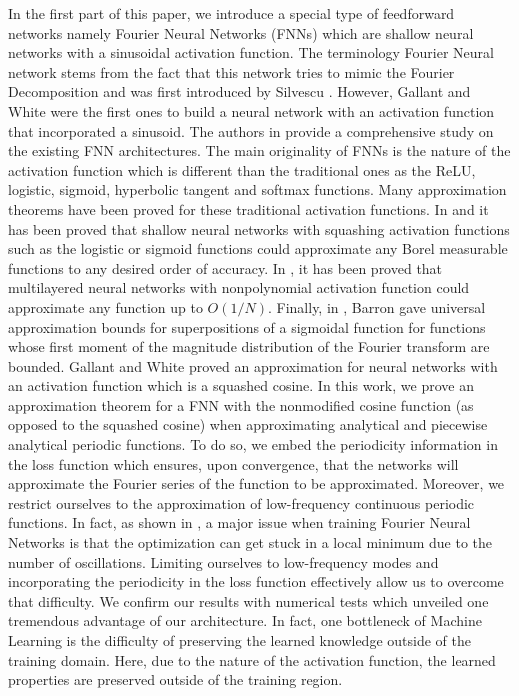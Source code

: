 \documentclass[AMS,STIX1COL]{WileyNJD-v2}
\begin{document}
In the first part of this paper, we introduce a special type of feedforward networks namely Fourier Neural Networks (FNNs) which are shallow neural networks with a sinusoidal activation function. The terminology Fourier Neural network stems from the fact that this network tries to mimic the Fourier Decomposition and was first introduced by Silvescu \cite{Silvescu}. However, Gallant and White \cite{Gallant} were the first ones to build a neural network with an activation function that incorporated a sinusoid. The authors in \cite{Zhumekonov2019} provide a comprehensive study on the existing FNN architectures. The main originality of FNNs is the nature of the activation function which is different than the traditional ones as the ReLU, logistic, sigmoid, hyperbolic tangent and softmax functions. Many approximation theorems have been proved for these traditional activation functions. In \cite{Cybenko1992} and \cite{HORNIK1989} it has been proved that shallow neural networks with squashing activation functions such as the logistic or sigmoid functions could approximate any Borel measurable functions to any desired order of accuracy. In \cite{Leshno}, it has been proved that multilayered neural networks with nonpolynomial activation function could approximate any function up to $O(1/N)$. Finally,  in \cite{Barron}, Barron gave universal approximation bounds for superpositions of a sigmoidal function for functions whose first moment of the magnitude distribution of the Fourier transform are bounded. Gallant and White \cite{Gallant} proved an approximation for neural networks with an activation function which is a squashed cosine. In this work, we prove an approximation theorem for a FNN with the nonmodified cosine function (as opposed to the squashed cosine) when approximating analytical and piecewise analytical periodic functions. To do so, we embed the periodicity information in the loss function which ensures, upon convergence, that the networks will approximate the Fourier series of the function to be approximated. Moreover, we restrict ourselves to the approximation of low-frequency continuous periodic functions. In fact, as shown in \cite{Parascandolo2017}, a major issue when training Fourier Neural Networks is that the optimization can get stuck in a local minimum due to the number of oscillations. Limiting ourselves to low-frequency modes and incorporating the periodicity in the loss function effectively allow us to overcome that difficulty. We confirm our results with numerical tests which unveiled one tremendous advantage of our architecture. In fact, one bottleneck of Machine Learning is the difficulty of preserving the learned knowledge outside of the training domain. Here, due to the nature of the activation function, the learned properties are preserved outside of the training region. 
\end{document}
